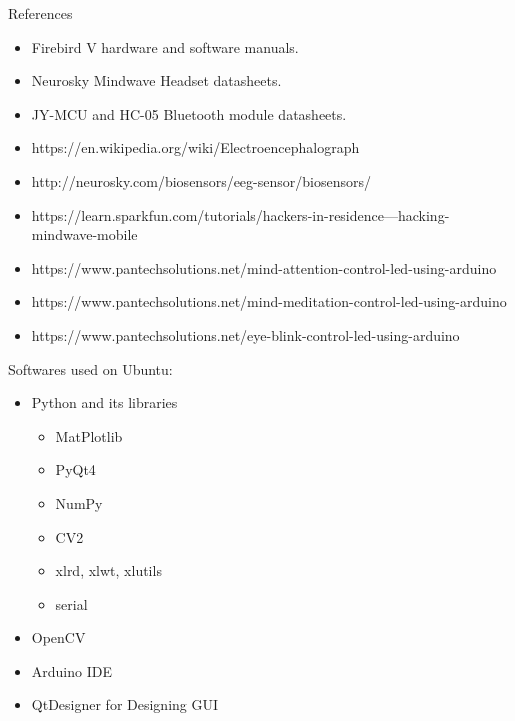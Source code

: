 \documentclass[14pt]{article}
\begin{document}
\break

\newpage
\begin{center}
{\Huge References}
\end{center}

\begin{itemize}
	\item Firebird V hardware and software manuals.
	\item Neurosky Mindwave Headset datasheets.
	\item JY-MCU and HC-05 Bluetooth module datasheets.
	\item https://en.wikipedia.org/wiki/Electroencephalograph
	\item http://neurosky.com/biosensors/eeg-sensor/biosensors/
	\item https://learn.sparkfun.com/tutorials/hackers-in-residence---hacking-mindwave-mobile
	\item https://www.pantechsolutions.net/mind-attention-control-led-using-arduino
	\item https://www.pantechsolutions.net/mind-meditation-control-led-using-arduino
	\item https://www.pantechsolutions.net/eye-blink-control-led-using-arduino
\end{itemize}
\hspace{15pt}

\newpage
\begin{center}
	{\Huge Softwares used on Ubuntu:}
\end{center}
\begin{itemize}
	\item Python and its libraries 
	\begin{itemize}
		\item MatPlotlib
		\item PyQt4
		\item NumPy
		\item CV2
		\item xlrd, xlwt, xlutils
		\item serial
	\end{itemize}
	\item OpenCV
	\item Arduino IDE
	\item QtDesigner for Designing GUI
\end{itemize}
\end{document}
